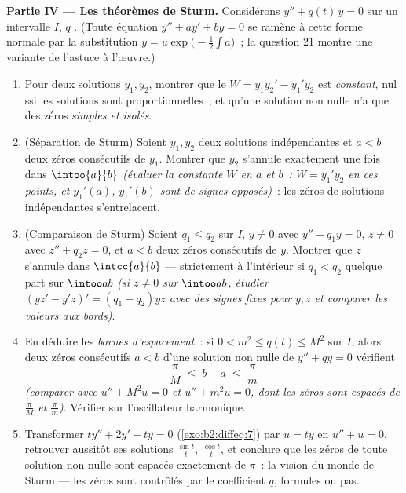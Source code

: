 \begin{problem}
\medskip
\noindent\textbf{Partie IV --- Les théorèmes de Sturm.} Considérons
$y'' + q(t)\,y = 0$ sur un intervalle $I$, $q$ . (Toute
équation $y'' + ay' + by = 0$ se ramène à cette forme normale par
la substitution $y = u\exp\bigl(-\frac12\int a\bigr)$~; la question
21 montre une variante de l'astuce à l'œuvre.)
\begin{enumerate}[resume]
  \item Pour deux solutions $y_1, y_2$, montrer que le 
        $W = y_1y_2' - y_1'y_2$ est \emph{constant}, nul ssi
        les solutions sont proportionnelles~; et qu'une solution
        non nulle n'a que des zéros \emph{simples et isolés}.
  \item (Séparation de Sturm) Soient $y_1, y_2$ deux solutions
        indépendantes et $a < b$ deux zéros consécutifs de $y_1$.
        Montrer que $y_2$ s'annule exactement une fois dans
        $\intoo{a}{b}$ \emph{(évaluer la constante $W$ en $a$
        et $b$~: $W = y_1'y_2$ en ces points, et $y_1'(a)$,
        $y_1'(b)$ sont de signes opposés)}~: les zéros de
        solutions indépendantes s'entrelacent.
  \item (Comparaison de Sturm) Soient $q_1 \leq q_2$ sur $I$, $y
        \neq 0$ avec $y'' + q_1y = 0$, $z \neq 0$ avec $z'' +
        q_2z = 0$, et $a < b$ deux zéros consécutifs de $y$.
        Montrer que $z$ s'annule dans $\intcc{a}{b}$ ---
        strictement à l'intérieur si $q_1 < q_2$ quelque part sur
        $\intoo ab$ \emph{(si $z \neq 0$ sur $\intoo ab$, étudier
        $(yz' - y'z)' = (q_1 - q_2)yz$ avec des signes fixes pour
        $y, z$ et comparer les valeurs aux bords)}.
  \item En déduire les \emph{bornes d'espacement}~: si $0 < m^2
        \leq q(t) \leq M^2$ sur $I$, alors deux zéros consécutifs
        $a < b$ d'une solution non nulle de $y'' + qy = 0$
        vérifient
        \[
        \frac{\pi}{M} \;\leq\; b - a \;\leq\; \frac{\pi}{m}
        \]
        \emph{(comparer avec $u'' + M^2u = 0$ et $u'' + m^2u
        = 0$, dont les zéros sont espacés de $\frac\pi M$ et
        $\frac\pi m$)}. Vérifier sur l'oscillateur harmonique.
  \item Transformer $ty'' + 2y' + ty = 0$
        (\cref{exo:b2:diffeq:7}) par $u = ty$ en $u'' + u =
        0$, retrouver aussitôt ses solutions $\frac{\sin t}t$,
        $\frac{\cos t}{t}$, et conclure que les zéros de toute
        solution non nulle sont espacés exactement de $\pi$~: la
        vision du monde de Sturm --- les zéros sont contrôlés par
        le coefficient $q$, formules ou pas.
\end{enumerate}


\end{problem}
